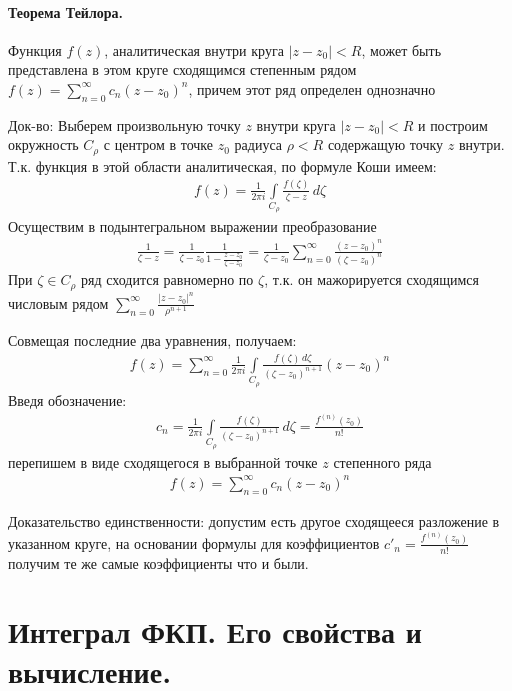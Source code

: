 \documentclass[12pt]{extarticle}
\renewcommand{\d}{\,d}
\begin{document}
\paragraph{Теорема Тейлора.} Функция $f(z)$,
аналитическая внутри круга $|z-z_{0}|<R$, может быть представлена в этом
круге сходящимся степенным рядом
$f(z)=\sum\limits_{n=0}^{\infty}c_{n}(z-z_{0})^{n}$, причем этот ряд
определен однозначно
\par Док-во: Выберем произвольную точку $z$ внутри круга $|z-z_{0}|<R$ и построим
окружность $C_{\rho}$ с центром в точке $z_{0}$ радиуса $\rho < R$
содержащую точку $z$ внутри. Т.к. функция в этой области аналитическая,
по формуле Коши имеем:
\begin{eqnarray*}
    f(z)=\frac{1}{2\pi
    i}\int\limits_{C_{\rho}}\frac{f(\zeta)}{\zeta-z}\d{\zeta}
\end{eqnarray*}
Осуществим в подынтегральном выражении преобразование
\begin{eqnarray*}
\frac{1}{\zeta-z}
=\frac{1}{\zeta-z_{0}}\frac{1}{1-\frac{z-z_{0}}{\zeta-z_{0}}}
=\frac{1}{\zeta-z_{0}}\sum\limits_{n=0}^{\infty}\frac{(z-z_{0})^{n}}{(\zeta-z_{0})^{n}}
\end{eqnarray*}
При $\zeta\in C_{\rho}$ ряд сходится равномерно по $\zeta$, т.к. он
мажорируется сходящимся числовым рядом
$\sum\limits_{n=0}^{\infty}\frac{|z-z_{0}|^{n}}{\rho^{n+1}}$
\par Совмещая последние два уравнения, получаем:
\begin{eqnarray*}
    f(z)=\sum\limits_{n=0}^{\infty}\frac{1}{2\pi i}
    \int\limits_{C_{\rho}}\frac{f(\zeta)\d{\zeta}}{(\zeta-z_{0})^{n+1}}(z-z_{0})^{n}
\end{eqnarray*}
Введя обозначение:
\begin{eqnarray*}
    c_{n}=\frac{1}{2\pi i}\int\limits_{C_{\rho}}
    \frac{f(\zeta)}{(\zeta-z_{0})^{n+1}}\d{\zeta}
    =\frac{f^{(n)}(z_{0})}{n!}
\end{eqnarray*}
перепишем в виде сходящегося в выбранной точке $z$ степенного ряда
\begin{eqnarray*}
    f(z)=\sum\limits_{n=0}^{\infty}c_{n}(z-z_{0})^{n}
\end{eqnarray*}
\par Доказательство единственности: допустим есть другое сходящееся
разложение в указанном круге, на основании формулы для коэффициентов
$c'_{n}=\frac{f^{(n)}(z_{0})}{n!}$ получим те же самые коэффициенты что
и были.

\section{Интеграл ФКП. Его свойства и вычисление.}
\end{document}

